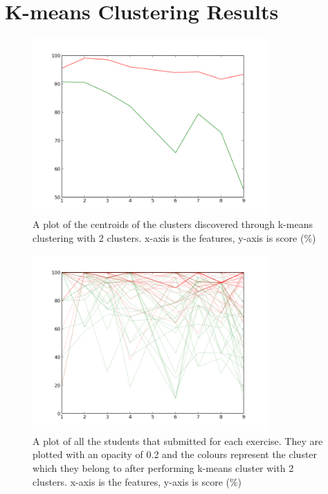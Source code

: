 \section{K-means Clustering Results}

\begin{figure}[h!]
\centering
\includegraphics[width=0.8\textwidth]{images/kmeans_2_centers.png}
\caption{A plot of the centroids of the clusters discovered through k-means clustering with 2 clusters. x-axis is the features, y-axis is score (\%)}
\label{fig:kmeans_2_centers}
\end{figure}

\begin{figure}[h!]
\centering
\includegraphics[width=0.8\textwidth]{images/kmeans_2.png}
\caption{A plot of all the students that submitted for each exercise. They are plotted with an opacity of 0.2 and the colours represent the cluster which they belong to after performing k-means cluster with 2 clusters. x-axis is the features, y-axis is score (\%)}
\label{fig:kmeans_2}
\end{figure}

